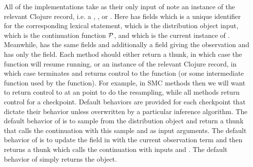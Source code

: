 All of the \checkpoint implementations
take as their only input of note an instance of the relevant Clojure record, i.e. a
 , , or .  
 Here  has
fields  which is a unique identifier for the corresponding lexical \sample statement, 
which is the distribution object input,  which is the continuation function $\mathcal{P}$, and 
which is the current instance of \angstate.  Meanwhile,  has the same fields and additionally
a  field giving the observation and  has only the  field.  Each
\checkpoint method should either return a thunk, in which case the  function will resume running,
or an instance of the relevant Clojure record, in which case  terminates and returns control to the \anginfer
function (or some intermediate function used by the \anginfer function).  For example, in SMC methods
then we will want to return control to \anginfer at an \observe point to do the resampling, while all methods
return control for a  checkpoint.
Default behaviors are provided for each checkpoint that dictate their behavior unless overwritten by
a particular inference algorithm.  The default behavior of \sample is to sample from the distribution
object and return a thunk that calls the continuation with this sample and \angstate as input arguments.
The default behavior of \observe is to update the  field in \angstate with the current
observation term and then returns a thunk which calls the continuation with inputs  and \angstate.  The default behavior
of  simply returns the  object.